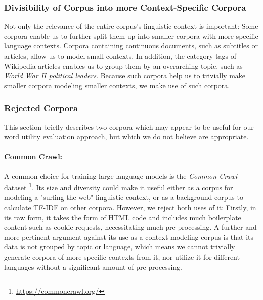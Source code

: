 \subsubsection{Divisibility of Corpus into more Context-Specific Corpora}
Not only the relevance of the entire corpus's linguistic context is important:
Some corpora enable us to further split them up into smaller corpora with more specific language contexts.
Corpora containing continuous documents, such as subtitles or articles, allow us to model small contexts.
In addition, the category tags of Wikipedia articles enables us to group them by an overarching topic, such as \textit{World War II political leaders}.
Because such corpora help us to trivially make smaller corpora modeling smaller contexts, we make use of such corpora.

\subsubsection{Rejected Corpora} \label{sec:rejected-corpora}
This section briefly describes two corpora which may appear to be useful for our word utility evaluation approach, but which we do not believe are appropriate.

\paragraph{Common Crawl:}
A common choice for training large language models is the \textit{Common Crawl} dataset \footnote{\url{https://commoncrawl.org/}}.
Its size and diversity could make it useful either as a corpus for modeling a "surfing the web" linguistic context, or as a background corpus to calculate TF-IDF on other corpora.
However, we reject both uses of it:
Firstly, in its raw form, it takes the form of HTML code and includes much boilerplate content such as cookie requests, necessitating much pre-processing.
A further and more pertinent argument against its use as a context-modeling corpus is that its data is not grouped by topic or language, which means we cannot trivially generate corpora of more specific contexts from it, nor utilize it for different languages without a significant amount of pre-processing.

